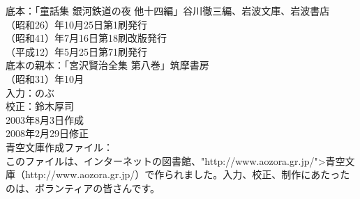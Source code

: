 \documentclass[
a4paper,
10pt,
book]
{tarticle}
\begin{document}
\newpage
\nolinenumbers
底本：「童話集 銀河鉄道の夜 他十四編」谷川徹三編、岩波文庫、岩波書店
\\
（昭和26）年10月25日第1刷発行\\
（昭和41）年7月16日第18刷改版発行\\
（平成12）年5月25日第71刷発行\\
底本の親本：「宮沢賢治全集 第八巻」筑摩書房\\
（昭和31）年10月\\
入力：のぶ\\
校正：鈴木厚司\\
2003年8月3日作成\\
2008年2月29日修正\\
青空文庫作成ファイル：\\
このファイルは、インターネットの図書館、"http://www.aozora.gr.jp/">青空文庫（http://www.aozora.gr.jp/）で作られました。入力、校正、制作にあたったのは、ボランティアの皆さんです。\\
\\
\end{document}
